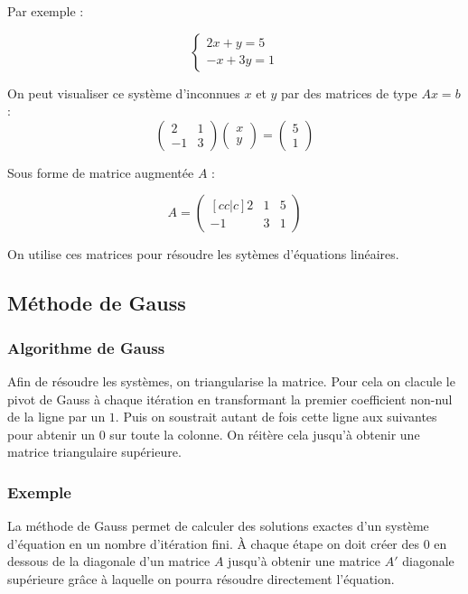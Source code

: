\documentclass{article}
\begin{document}
Par exemple :

\[\begin{cases}
  2x + y = 5 \\
  -x + 3y = 1
 \end{cases}\]

On peut visualiser ce système d'inconnues $x$ et $y$ par des matrices de type $Ax=b$ :
\[\begin{pmatrix}
  2  & 1 \\
  -1 & 3
 \end{pmatrix}
 \begin{pmatrix}
  x \\
  y
 \end{pmatrix}
 =
 \begin{pmatrix}
  5 \\
  1
 \end{pmatrix}\]

Sous forme de matrice augmentée $A$ :

\[ A =
 \begin{pmatrix}[cc|c]
  2  & 1 & 5 \\
  -1 & 3 & 1
 \end{pmatrix}\]

On utilise ces matrices pour résoudre les sytèmes d'équations linéaires.

\subsection{Méthode de Gauss}

\subsubsection{Algorithme de Gauss}

Afin de résoudre les systèmes, on triangularise la matrice. Pour cela on clacule le pivot de Gauss à chaque itération en transformant la premier coefficient non-nul de la ligne par un $1$.
Puis on soustrait autant de fois cette ligne aux suivantes pour abtenir un $0$ sur toute la colonne.
On réitère cela jusqu'à obtenir une matrice triangulaire supérieure.

\subsubsection{Exemple}

La méthode de Gauss permet de calculer des solutions exactes d'un système d'équation en un nombre d'itération fini.
À chaque étape on doit créer des $0$ en dessous de la diagonale d'un matrice $A$ jusqu'à obtenir une matrice $A'$ diagonale supérieure grâce à laquelle on pourra résoudre directement l'équation.
\end{document}
